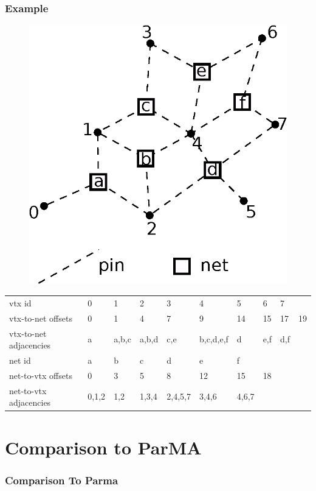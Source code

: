 \documentclass{beamer}
\begin{document}
\begin{frame}
  \frametitle{Example}
  \begin{figure}
    \centering
    \includegraphics[width=.4\textwidth]{figures/hypergraph.eps}
  \end{figure}  
  {\tiny
  \begin{table}[]
    \centering
    \label{my-label}
    \begin{tabular}{llllllllll}
      vtx id                 & 0     & 1     & 2     & 3       & 4         & 5     & 6   & 7   &    \\
      vtx-to-net offsets     & 0     & 1     & 4     & 7       & 9         & 14    & 15  & 17  & 19 \\
      vtx-to-net adjacencies & a     & a,b,c & a,b,d & c,e     & b,c,d,e,f & d     & e,f & d,f &    \\
      net id                 & a     & b     & c     & d       & e         & f     &     &     &    \\
      net-to-vtx offsets     & 0     & 3     & 5     & 8       & 12        & 15    & 18  &     &    \\
      net-to-vtx adjacencies & 0,1,2 & 1,2   & 1,3,4 & 2,4,5,7 & 3,4,6     & 4,6,7 &     &     &   
    \end{tabular}
  \end{table}
  }
\end{frame}

\section{Comparison to ParMA}

\begin{frame}
  \frametitle{Comparison To Parma}
\end{frame}
\end{document}
